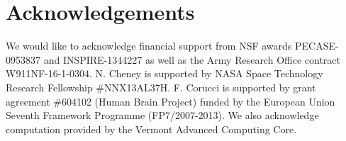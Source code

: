 \section{Acknowledgements}

We would like to acknowledge financial support from
NSF awards PECASE-0953837 and INSPIRE-1344227
as well as the Army Research Office contract W911NF-16-1-0304.
N. Cheney is supported by NASA Space Technology Research Fellowship \#NNX13AL37H.
F. Corucci is supported by grant agreement \#604102 (Human Brain Project) funded by the European Union Seventh Framework Programme (FP7/2007-2013).
We also acknowledge computation provided by the Vermont Advanced Computing Core.
